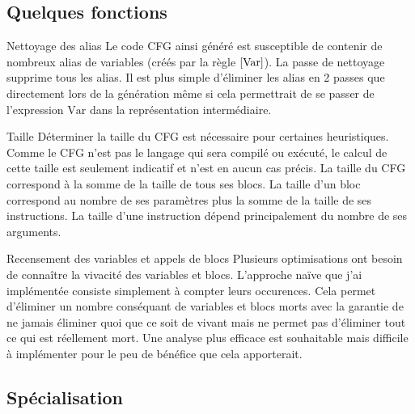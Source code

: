 \documentclass{beamer}
\begin{document}
\subsection{Quelques fonctions}

\begin{frame}{Nettoyage des alias}
    Le code CFG ainsi généré est susceptible de contenir de nombreux alias de variables (créés par la règle $\eqref{Var}$). La passe de nettoyage supprime tous les alias. Il est plus simple d'éliminer les alias en 2 passes que directement lors de la génération même si cela permettrait de se passer de l'expression $\text{Var}$ dans la représentation intermédiaire.
\end{frame}

\begin{frame}{Taille}
    Déterminer la taille du CFG est nécessaire pour certaines heuristiques. Comme le CFG n'est pas le langage qui sera compilé ou exécuté, le calcul de cette taille est seulement indicatif et n'est en aucun cas précis. La taille du CFG correspond à la somme de la taille de tous ses blocs. La taille d'un bloc correspond au nombre de ses paramètres plus la somme de la taille de ses instructions. La taille d'une instruction dépend principalement du nombre de ses arguments.
\end{frame}

\begin{frame}{Recensement des variables et appels de blocs}
    Plusieurs optimisations ont besoin de connaître la vivacité des variables et blocs. L'approche naïve que j'ai implémentée consiste simplement à compter leurs occurences. Cela permet d'éliminer un nombre conséquant de variables et blocs morts avec la garantie de ne jamais éliminer quoi que ce soit de vivant mais ne permet pas d'éliminer tout ce qui est réellement mort. Une analyse plus efficace est souhaitable mais difficile à implémenter pour le peu de bénéfice que cela apporterait.
\end{frame}

\subsection{Spécialisation}

\end{document}
